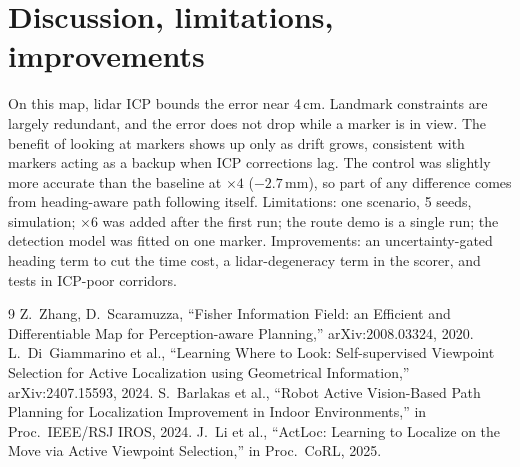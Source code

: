 \documentclass[10pt,twocolumn]{article}
\begin{document}
\section{Discussion, limitations, improvements}
On this map, lidar ICP bounds the error near 4\,cm. Landmark constraints are largely redundant, and the error does not drop while a marker is in view. The benefit of looking at markers shows up only as drift grows, consistent with markers acting as a backup when ICP corrections lag.
The control was slightly more accurate than the baseline at ${\times}4$ ($-2.7$\,mm), so part of any difference comes from heading-aware path following itself.
Limitations: one scenario, 5 seeds, simulation; ${\times}6$ was added after the first run; the route demo is a single run; the detection model was fitted on one marker. Improvements: an uncertainty-gated heading term to cut the time cost, a lidar-degeneracy term in the scorer, and tests in ICP-poor corridors.

\footnotesize
\begin{thebibliography}{9}\setlength{\itemsep}{0pt}
 Z.~Zhang, D.~Scaramuzza, ``Fisher Information Field: an Efficient and Differentiable Map for Perception-aware Planning,'' arXiv:2008.03324, 2020.
 L.~Di~Giammarino et al., ``Learning Where to Look: Self-supervised Viewpoint Selection for Active Localization using Geometrical Information,'' arXiv:2407.15593, 2024.
 S.~Barlakas et al., ``Robot Active Vision-Based Path Planning for Localization Improvement in Indoor Environments,'' in Proc.\ IEEE/RSJ IROS, 2024.
 J.~Li et al., ``ActLoc: Learning to Localize on the Move via Active Viewpoint Selection,'' in Proc.\ CoRL, 2025.
\end{thebibliography}

\clearpage
\onecolumn
\setcounter{figure}{0}
\renewcommand{\thefigure}{A\arabic{figure}}
\captionsetup{font=small,skip=4pt}
\setlength{\textfloatsep}{12pt plus 2pt}\setlength{\floatsep}{12pt plus 2pt}
\makeatletter\setlength{\@fptop}{0pt}\makeatother%
\label{app:start}
\end{document}
